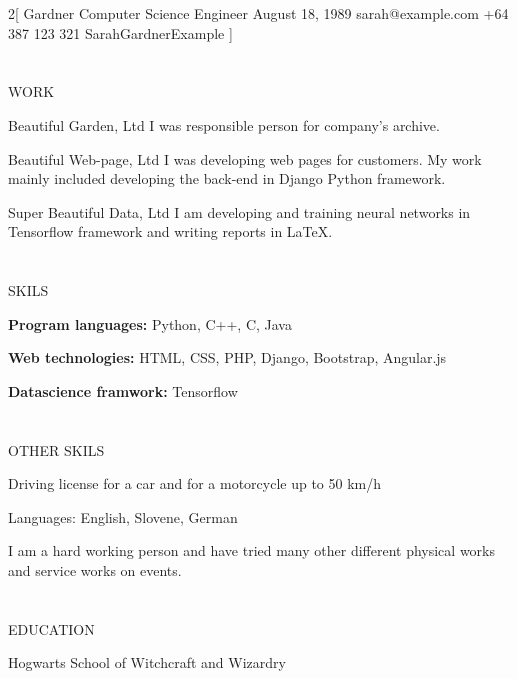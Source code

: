 \documentclass{my_cv}
\begin{document}
\begin{multicols}{2}[
        {Gardner}%
        {Computer Science Engineer}%
        {August 18, 1989}%
        {sarah@example.com}%
        {+64 387 123 321}%
        {SarahGardnerExample}
]

\section{\faPencil}{WORK}

%
    {Beautiful Garden, Ltd}%
    {I was responsible person for company’s archive.}

%
    {Beautiful Web-page, Ltd}%
    {I was developing web pages for customers. My work mainly included developing the back-end in Django Python framework.}
     
%
    {Super Beautiful Data, Ltd}%
    {I am developing and training neural networks in Tensorflow framework and writing reports in LaTeX.}
    
\section{\faFileText}{SKILS}

\textbf{Program languages:} Python, C++, C, Java

\noindent\textbf{Web technologies:} HTML, CSS, PHP,
Django, Bootstrap, Angular.js

\noindent\textbf{Datascience framwork:} Tensorflow

\section{\faFileText}{OTHER SKILS}

Driving license for a car and for a motorcycle
up to 50 km/h

\noindent Languages: English, Slovene, German

\noindent I am a hard working person and have tried
many other different physical works and
service works on events.

\columnbreak

\section{\faGraduationCap}{EDUCATION}

%
    {Hogwarts School of Witchcraft and Wizardry}
    

\end{multicols}
\end{document}

